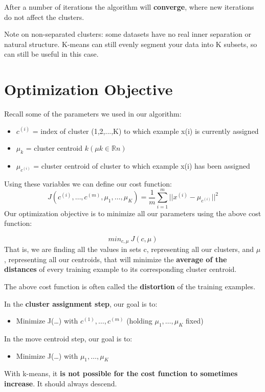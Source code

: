 After a number of iterations the algorithm will \textbf{converge}, where new iterations do not affect the clusters.

Note on non-separated clusters: some datasets have no real inner separation or natural structure. K-means can still evenly segment your data into K subsets, so can still be useful in this case.
\section{Optimization Objective}
Recall some of the parameters we used in our algorithm:
\begin{itemize}
	\item $c^{(i)}$ = index of cluster (1,2,...,K) to which example x(i) is currently assigned
	\item $\mu_k$ = cluster centroid $k(\mu k\in \mathbb{R}n)$
	\item $\mu_{c^{(i)}}$ = cluster centroid of cluster to which example x(i) has been assigned
\end{itemize}

Using these variables we can define our cost function:
\begin{equation}
J(c^{(i)},\dots,c^{(m)},\mu_1,\dots,\mu_K) = \dfrac{1}{m}\sum_{i=1}^m ||x^{(i)} - \mu_{c^{(i)}}||^2
\end{equation}
Our optimization objective is to minimize all our parameters using the above cost function:

$$min_{c,\mu}\ J(c,\mu)$$
That is, we are finding all the values in sets c, representing all our clusters, and $\mu$, representing all our centroids, that will minimize the \textbf{average of the distances} of every training example to its corresponding cluster centroid.

The above cost function is often called the \textbf{distortion} of the training examples.

In the \textbf{cluster assignment step}, our goal is to:
\begin{itemize}
	\item Minimize J(…) with $c^{(1)},\dots,c^{(m)}$ (holding $\mu_1,\dots,\mu_K$ fixed)
\end{itemize}

In the move centroid step, our goal is to:
\begin{itemize}
	\item Minimize J(…) with $\mu_1,\dots,\mu_K$
\end{itemize}

With k-means, it \textbf{is not possible for the cost function to sometimes increase}. It should always descend.

